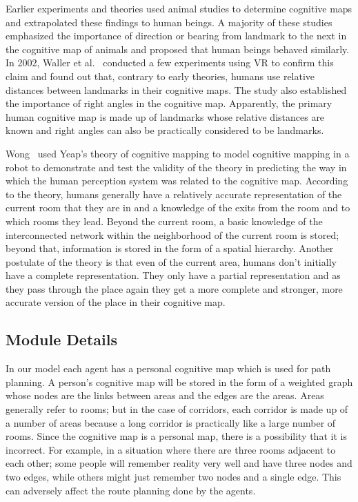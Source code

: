 Earlier experiments and theories used animal studies to determine cognitive maps and extrapolated these findings to human beings. A majority of these studies emphasized the importance of direction or bearing from landmark to the next in the cognitive map of animals and proposed that human beings behaved similarly. In 2002, Waller et al.~\cite{Waller:2002we} conducted a few experiments using VR to confirm this claim and found out that, contrary to early theories, humans use relative distances between landmarks in their cognitive maps. The study also established the importance of right angles in the cognitive map. Apparently, the primary human cognitive map is made up of landmarks whose relative distances are known and right angles can also be practically considered to be landmarks.

Wong~\cite{Wong:2008up} used Yeap's theory of cognitive mapping to model cognitive mapping in a robot to demonstrate and test the validity of the theory in predicting the way in which the human perception system was related to the cognitive map. According to the theory, humans generally have a relatively accurate representation of the current room that they are in and a knowledge of the exits from the room and to which rooms they lead. Beyond the current room, a basic knowledge of the interconnected network within the neighborhood of the current room is stored; beyond that, information is stored in the form of a spatial hierarchy. Another postulate of the theory is that even of the current area, humans don't initially have a complete representation. They only have a partial representation and as they pass through the place again they get a more complete and stronger, more accurate version of the place in their cognitive map.

\subsection{Module Details}
\label{CFW:EnvironmentKnowledgeImplementation}
In our model each agent has a personal cognitive map which is used for path planning. A person's cognitive map will be stored in the form of a weighted graph whose nodes are the links between areas and the edges are the areas. Areas generally refer to rooms; but in the case of corridors, each corridor is made up of a number of areas because a long corridor is practically like a large number of rooms. Since the cognitive map is a personal map, there is a possibility that it is incorrect. For example, in a situation where there are three rooms adjacent to each other; some people will remember reality very well and have three nodes and two edges, while others might just remember two nodes and a single edge. This can adversely affect the route planning done by the agents.

